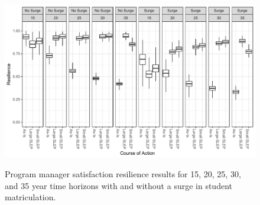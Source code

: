 \documentclass[preprint,12pt]{elsarticle}
\begin{document}
\begin{landscape}
\begin{figure}[h]
  \begin{center}
    \includegraphics[width=8.2in]{PMSatTH}
  \end{center}
\begin{quote}
  \caption[Program manager satisfaction resilience results]{Program
    manager satisfaction resilience results for 15, 20, 25, 30, and 35
    year time horizons with and without a surge in student matriculation.
    \label{f:PMSatTH}}
\end{quote}
\end{figure}
\end{landscape}

\end{document}

